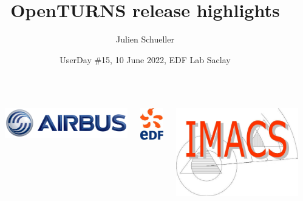 \documentclass{beamer}
\title[OpenTURNS]{OpenTURNS release highlights}
\author[OpenTURNS et al.]{Julien Schueller}
\date[]{UserDay \#15, 10 June 2022, EDF Lab Saclay}
\begin{document}

  \begin{frame}
  \titlepage

  \begin{columns}
  \begin{column}[t]{0.05\textwidth}
        \end{column}
  
  \begin{center}
\includegraphics[height=0.04\textheight]{figures/airbus-logo-3d-blue.png}
\end{center}

  \begin{center}
\includegraphics[height=0.09\textheight]{figures/logo-edf.jpg}
\end{center}

  \begin{center}
\includegraphics[height=0.09\textheight]{figures/imacs-logo.jpg}
\end{center}


\end{columns}
\end{frame}
\end{document}
